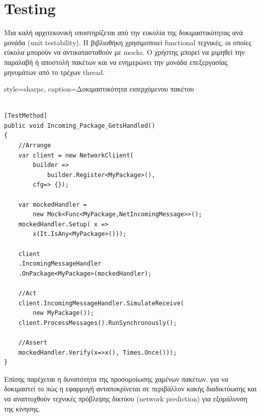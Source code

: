 	\section{Testing}
	Μια καλή αρχιτεκονική υποστηρίζεται από την ευκολία της δοκιμαστικότητας ανά μονάδα (unit testability). Η βιβλιοθήκη χρησιμοποιεί functional τεχνικές, οι οποίες εύκολα μπορούν να αντικατασταθούν με \gls{mocks}. Ο χρήστης μπορεί να μιμηθεί την παραλαβή ή αποστολή πακέτων και να ενημερώνει την μονάδα επεξεργασίας μηνυμάτων από το τρέχων thread.
	
	\lstset
	{
		style=sharpc, 
		caption={Δοκιμαστικότητα εισερχόμενου πακέτου}
	}
	\begin{lstlisting}
	
[TestMethod]
public void Incoming_Package_GetsHandled()
{
	//Arrange
	var client = new NetworkCliient(
		builder => 
			builder.Register<MyPackage>(),
		cfg=> {});
		
	var mockedHandler = 
		new Mock<Func<MyPackage,NetIncomingMessage>>();
	mockedHandler.Setup( x => 
		x(It.IsAny<MyPackage>()));
	
	client
	.IncomingMessageHandler
	.OnPackage<MyPackage>(mockedHandler);	
	
	//Act	
	client.IncomingMessageHandler.SimulateReceive(
		new MyPackage());	
	client.ProcessMessages().RunSynchronously();
	
	//Assert
	mockedHandler.Verify(x=>x(), Times.Once()));
}
	\end{lstlisting}
		
	Επίσης παρέχεται η δυνατότητα της προσομοίωσης χαμένων πακέτων, για να δοκιμαστεί το πώς η εφαρμογή ανταποκρίνεται σε περιβάλλον κακής διαδικτύωσης και να αναπτυχθούν τεχνικές πρόβλεψης δικτύου (network prediction) για εξομάλυνση της κίνησης.
	